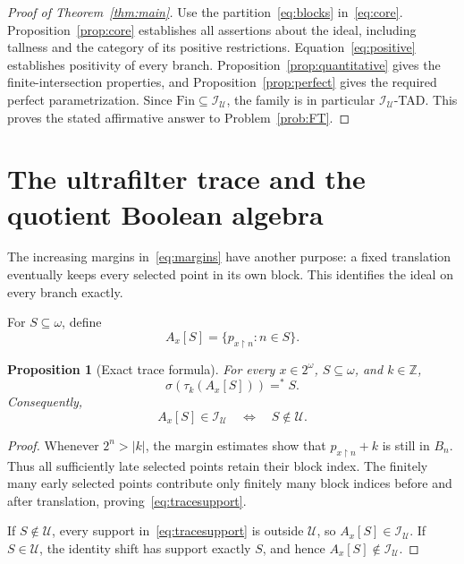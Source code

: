 \documentclass[11pt,a4paper]{article}
\newtheorem{proposition}[theorem]{Proposition}
\theoremstyle{definition}
\theoremstyle{remark}
\newcommand{\I}{\mathcal I}
\newcommand{\U}{\mathcal U}
\newcommand{\Fin}{\mathrm{Fin}}
\newcommand{\supp}{\sigma}
\newcommand{\sh}[2]{\tau_{#1}(#2)}
\newcommand{\eqfin}{=^{*}}
\newcommand{\restr}{\mathbin{\upharpoonright}}
\begin{document}
\begin{proof}[Proof of Theorem~\ref{thm:main}]
Use the partition~\eqref{eq:blocks} in~\eqref{eq:core}.
Proposition~\ref{prop:core} establishes all assertions about the ideal,
including tallness and the category of its positive restrictions.
Equation~\eqref{eq:positive} establishes positivity of every branch.
Proposition~\ref{prop:quantitative} gives the finite-intersection
properties, and Proposition~\ref{prop:perfect} gives the required
perfect parametrization. Since $\Fin\subseteq\I_\U$, the family is
in particular $\I_\U$-TAD. This proves the stated affirmative answer to
Problem~\ref{prob:FT}.
\end{proof}

\section{The ultrafilter trace and the quotient Boolean algebra}
\label{sec:trace}

The increasing margins in~\eqref{eq:margins} have another purpose:
a fixed translation eventually keeps every selected point in its own
block. This identifies the ideal on every branch exactly.

For $S\subseteq\omega$, define
\[
                   A_x[S]=\{p_{x\restr n}:n\in S\}.
\]
\begin{proposition}[Exact trace formula]
\label{prop:trace}
For every $x\in2^\omega$, $S\subseteq\omega$, and $k\in\mathbb Z$,
\begin{equation}
\label{eq:tracesupport}
                         \supp(\sh{k}{A_x[S]})\eqfin S.
\end{equation}
Consequently,
\begin{equation}
\label{eq:trace}
                         A_x[S]\in\I_\U
                              \quad\Longleftrightarrow\quad S\notin\U.
\end{equation}
\end{proposition}
\begin{proof}
Whenever $2^n>|k|$, the margin estimates show that
$p_{x\restr n}+k$ is still in $B_n$. Thus all sufficiently late selected
points retain their block index. The finitely many early selected
points contribute only finitely many block indices before and after
translation, proving~\eqref{eq:tracesupport}.

If $S\notin\U$, every support in~\eqref{eq:tracesupport} is outside
$\U$, so $A_x[S]\in\I_\U$. If $S\in\U$, the identity shift has support
exactly $S$, and hence $A_x[S]\notin\I_\U$.
\end{proof}
\end{document}
